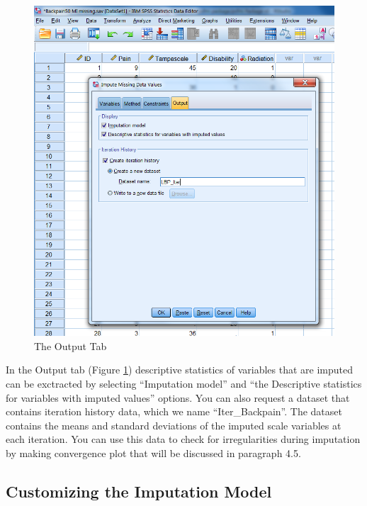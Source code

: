 \documentclass[
]{book}
\begin{document}
\begin{figure}

{\centering \includegraphics[width=0.9\linewidth]{images/fig4.9} 

}

\caption{The Output Tab}\label{fig:fig4-9}
\end{figure}

In the Output tab (Figure \ref{fig:fig4-9}) descriptive statistics of variables that are imputed can be exctracted by selecting ``Imputation model'' and ``the Descriptive statistics for variables with imputed values'' options. You can also request a dataset that contains iteration history data, which we name ``Iter\_Backpain''. The dataset contains the means and standard deviations of the imputed scale variables at each iteration. You can use this data to check for irregularities during imputation by making convergence plot that will be discussed in paragraph 4.5.

\hypertarget{customizing-the-imputation-model}{%
\subsection{Customizing the Imputation Model}\label{customizing-the-imputation-model}}
\end{document}
